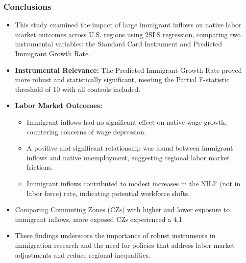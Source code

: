\begin{frame}
    \frametitle{Conclusions}
        \begin{itemize}
            \item This study examined the impact of large immigrant inflows on native labor market outcomes across U.S. regions using 2SLS regression, comparing two instrumental variables: the Standard Card Instrument and Predicted Immigrant Growth Rate.
            \item \textbf{Instrumental Relevance:} The Predicted Immigrant Growth Rate proved more robust and statistically significant, meeting the Partial F-statistic threshold of 10 with all controls included.
            \item \textbf{Labor Market Outcomes:}
            \begin{itemize}
                \item Immigrant inflows had no significant effect on native wage growth, countering concerns of wage depression.
                \item A positive and significant relationship was found between immigrant inflows and native unemployment, suggesting regional labor market frictions.
                \item Immigrant inflows contributed to modest increases in the NILF (not in labor force) rate, indicating potential workforce shifts.
            \end{itemize}
            \item Comparing Commuting Zones (CZs) with higher and lower exposure to immigrant inflows, more exposed CZs experienced a 4.1%
            \item These findings underscore the importance of robust instruments in immigration research and the need for policies that address labor market adjustments and reduce regional inequalities.
        \end{itemize}
\end{frame}

